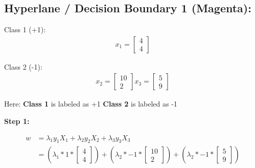 \documentclass[12pt]{report}
\begin{document}
\pagebreak

\subsection{Hyperlane / Decision Boundary 1 (Magenta):}

Class 1 (+1):
\begin{equation*}
	\begin{aligned}
		x_{1} = \begin{bmatrix}
			        4 \\
			        4
		        \end{bmatrix}
	\end{aligned}
\end{equation*}

Class 2 (-1):
\begin{equation*}
	\begin{aligned}
		x_{2} = \begin{bmatrix}
			        10 \\
			        2
		        \end{bmatrix}
		x_{3} = \begin{bmatrix}
			        5 \\
			        9
		        \end{bmatrix}
	\end{aligned}
\end{equation*}

Here:\newline
\textbf{Class 1} is labeled as +1 \newline
\textbf{Class 2} is labeled as -1

\textbf{Step 1:}

\begin{equation*}
	\begin{aligned}
		w & = \lambda_{1}y_{1}X_{1} + \lambda_{2}y_{2}X_{2} + \lambda_{3}y_{3}X_{3}                                       \\
		  & = (\lambda_{1} * 1 * \begin{bmatrix}
			                         4 \\
			                         4
		                         \end{bmatrix}) + (\lambda_{2} * -1 * \begin{bmatrix}
			                                                              10 \\
			                                                              2
		                                                              \end{bmatrix}) + (\lambda_{2} * -1 * \begin{bmatrix}
			                                                                                                   5 \\
			                                                                                                   9
		                                                                                                   \end{bmatrix})
	\end{aligned}
\end{equation*}
\end{document}
